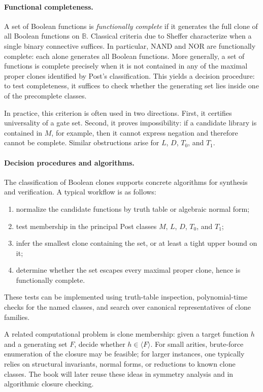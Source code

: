\documentclass[11pt]{article}
\begin{document}
\paragraph{Functional completeness.}
A set of Boolean functions is \emph{functionally complete} if it generates the full clone of all Boolean functions on $\mathbb{B}$. Classical criteria due to Sheffer characterize when a single binary connective suffices. In particular, NAND and NOR are functionally complete: each alone generates all Boolean functions. More generally, a set of functions is complete precisely when it is not contained in any of the maximal proper clones identified by Post's classification. This yields a decision procedure: to test completeness, it suffices to check whether the generating set lies inside one of the precomplete classes.

In practice, this criterion is often used in two directions. First, it certifies universality of a gate set. Second, it proves impossibility: if a candidate library is contained in $M$, for example, then it cannot express negation and therefore cannot be complete. Similar obstructions arise for $L$, $D$, $T_0$, and $T_1$.

\paragraph{Decision procedures and algorithms.}
The classification of Boolean clones supports concrete algorithms for synthesis and verification. A typical workflow is as follows:
\begin{enumerate}
  \item normalize the candidate functions by truth table or algebraic normal form;
  \item test membership in the principal Post classes $M$, $L$, $D$, $T_0$, and $T_1$;
  \item infer the smallest clone containing the set, or at least a tight upper bound on it;
  \item determine whether the set escapes every maximal proper clone, hence is functionally complete.
\end{enumerate}
These tests can be implemented using truth-table inspection, polynomial-time checks for the named classes, and search over canonical representatives of clone families.

A related computational problem is clone membership: given a target function $h$ and a generating set $F$, decide whether $h \in \langle F\rangle$. For small arities, brute-force enumeration of the closure may be feasible; for larger instances, one typically relies on structural invariants, normal forms, or reductions to known clone classes. The book will later reuse these ideas in symmetry analysis and in algorithmic closure checking.
\end{document}
